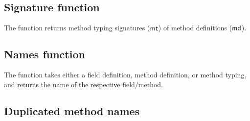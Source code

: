 \documentclass[acmlarge, anonymous, authordraft]{acmart}
\begin{document}
\subsection{Signature function}

The  function returns method typing signatures ($\mt$) of method definitions ($\md$).

\begin{mathpar}

\end{mathpar}

\subsection{Names function}

The  function takes either a field definition, method definition, or method typing, and returns the name of the respective
field/method.

\begin{mathpar}
\end{mathpar}

\begin{mathpar}
\end{mathpar}

\begin{mathpar}
\end{mathpar}

\begin{mathpar}

\end{mathpar}

\subsection{Duplicated method names}


\begin{mathpar}
\end{mathpar}
\end{document}
